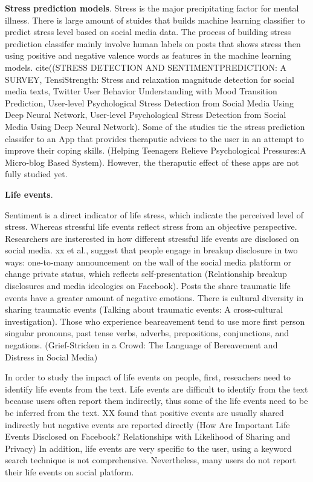 \textbf{Stress prediction models}. Stress is the major precipitating factor for mental illness. There is large amount of stuides that builds machine learning classifier to predict stress level based on social media data. The process of building stress prediction classifer mainly involve human labels on posts that shows stress then using positive and negative valence words as features in the machine learning models. cite((STRESS DETECTION AND SENTIMENTPREDICTION: A SURVEY, TensiStrength: Stress and relaxation magnitude detection for social media texts, Twitter User Behavior Understanding with Mood Transition Prediction, User-level Psychological Stress Detection from Social Media Using Deep Neural Network, User-level Psychological Stress Detection from Social Media Using Deep Neural Network). Some of the studies tie the stress prediction classifer to an App that provides theraputic advices to the user in an attempt to improve their coping skills. (Helping Teenagers Relieve Psychological Pressures:A Micro-blog Based System). However, the theraputic effect of these apps are not fully studied yet.

\textbf{Life events}. 

Sentiment is a direct indicator of life stress, which indicate the perceived level of stress. Whereas stressful life events reflect stress from an objective perspective. Researchers are insterested in how different stressful life events are disclosed on social media. xx et al., suggest that people engage in breakup disclosure in two ways: one-to-many announcement on the wall of the social media platform or change private status, which reflects self-presentation (Relationship breakup disclosures and media ideologies on Facebook). Posts the share traumatic life events have a greater amount of negative emotions. There is cultural diversity in sharing traumatic events (Talking about traumatic events: A cross-cultural investigation). Those who experience beareavement tend to use more first person singular pronouns, past tense verbs, adverbs, prepositions, conjunctions, and negations. (Grief-Stricken in a Crowd: The Language of Bereavement and Distress in Social Media)
 
 In order to study the impact of life events on people, first, reseachers need to identify life events from the text. Life events are difficult to identify from the text because users often report them indirectly, thus some of the life events need to be be inferred from the text. XX found that positive events are usually shared indirectly but negative events are reported directly (How Are Important Life Events Disclosed on Facebook? Relationships with Likelihood of Sharing and Privacy) In addition, life events are very specific to the user, using a keyword search technique is not comprehensive. Nevertheless, many users do not report their life events on social platform. 

